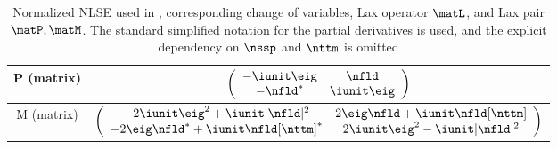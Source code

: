 \begin{table*}[p]
\begin{tabu}{|c|c|}
        P (matrix) &
        $\left( \begin{array}{cc} -\iunit\eig &
          \nfld  \\
          - \nfld^* &
          \iunit\eig \end{array}\right)$
        \\ \hline

        M (matrix) &
        $\left( \begin{array}{cc} -2\iunit\eig^2 + \iunit|\nfld|^2 &
          2\eig\nfld + \iunit\nfld[\nttm] \\
          - 2\eig\nfld^* + \iunit\nfld[\nttm]^* &
          2\iunit\eig^2 - \iunit|\nfld|^2 \end{array}\right)$
        \\ \hline



        \end{tabu}
   \caption{Normalized \ac{NLSE} used in \cite{ablowitz1974inverse,Yang10_Book,Buelow}, corresponding change of variables, Lax operator $\matL$, and Lax pair $\matP, \matM$. The standard simplified notation for the partial derivatives is used, and the explicit dependency on $\nssp$ and $\nttm$ is omitted}
  \label{tab:normalizations_comparison_yang}
\end{table*}
